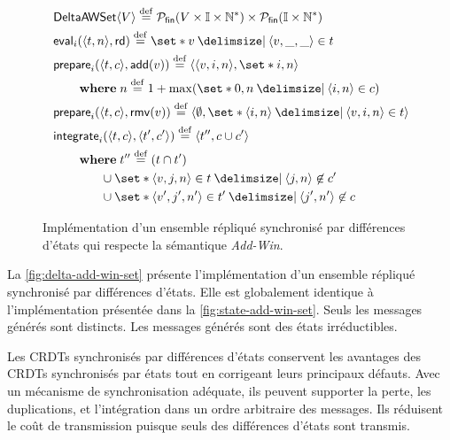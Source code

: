\begin{figure}[tb]
\centering
\begin{align}
&\trm{DeltaAWSet}\tuple*{V} \defeq \powerfset{V \times \mathbb{I} \times \mathbb{N}^*} \times \powerfset{\mathbb{I} \times \mathbb{N}^*} \label{eq:delta-awset-state}\\
&\trm{eval}_i(\tuple*{t, n}, \trm{rd}) \defeq \set*{v \given \tuple*{v, \_, \_} \in t} \label{eq:delta-awset-eval}\\
&\begin{aligned}
\MoveEqLeft\trm{prepare}_i(\tuple*{t, c}, \trm{add}(v)) \defeq \tuple*{\tuple*{v, i, n},\set*{i, n}}\\
    &\where n \defeq 1 + \max(\set*{0,n \given \tuple*{i, n} \in c})
\end{aligned}\label{eq:delta-awset-prep-add}\\
&\trm{prepare}_i(\tuple*{t, c}, \trm{rmv}(v)) \defeq \tuple*{\emptyset, \set*{\tuple*{i, n} \given \tuple*{v, i, n} \in t}}\label{eq:delta-awset-prep-rmv}\\
&\begin{aligned}
\MoveEqLeft \trm{integrate}_i(\tuple*{t, c}, \tuple*{t', c'}) \defeq \tuple*{t'', c \cup c'}\\
    &\begin{aligned}
    \MoveEqLeft\where t'' \defeq (t \cap t')\\
    &\cup \set*{\tuple*{v, j, n} \in t \given \tuple*{j, n} \not\in c'}\\
    &\cup \set*{\tuple*{v', j', n'} \in t' \given \tuple*{j', n'} \not\in c}
    \end{aligned}
\end{aligned}\label{eq:delta-awset-integr}
\end{align}
\caption[Implémentation d'un ensemble répliqué synchronisé par différences d'états]{Implémentation d'un ensemble répliqué synchronisé par différences d'états qui respecte la sémantique \emph{Add-Win}.}\label{fig:delta-add-win-set}
\end{figure}

La \autoref{fig:delta-add-win-set} présente l'implémentation d'un ensemble répliqué synchronisé par différences d'états.
Elle est globalement identique à l'implémentation présentée dans la \autoref{fig:state-add-win-set}.
Seuls les messages générés sont distincts.
Les messages générés sont des états irréductibles.

Les \acp{CRDT} synchronisés par différences d'états conservent les avantages des \acp{CRDT} synchronisés par états tout en corrigeant leurs principaux défauts.
Avec un mécanisme de synchronisation adéquate, ils peuvent supporter la perte, les duplications, et l'intégration dans un ordre arbitraire des messages.
Ils réduisent le coût de transmission puisque seuls des différences d'états sont transmis.


